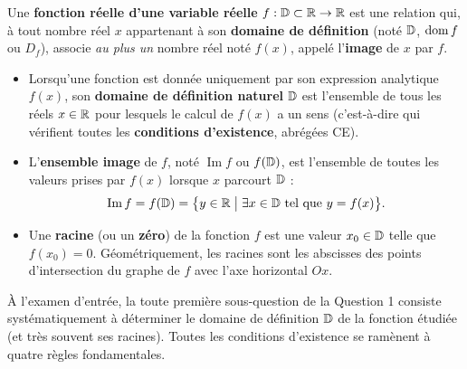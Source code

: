 \begin{definition}
Une \textbf{fonction réelle d'une variable réelle} $f : \mathbb{D} \subset \mathbb{R} \to \mathbb{R}$ est une relation qui, à tout nombre réel $x$ appartenant à son \textbf{domaine de définition} (noté $\mathbb{D}$, $\operatorname{dom} f$ ou $D_f$), associe \emph{au plus un} nombre réel noté $f(x)$, appelé l'\textbf{image} de $x$ par $f$.
\begin{itemize}
    \item Lorsqu'une fonction est donnée uniquement par son expression analytique $f(x)$, son \textbf{domaine de définition naturel} $\mathbb{D}$ est l'ensemble de tous les réels $x \in \mathbb{R}$ pour lesquels le calcul de $f(x)$ a un sens (c'est-à-dire qui vérifient toutes les \textbf{conditions d'existence}, abrégées CE).
    \item L'\textbf{ensemble image} de $f$, noté $\operatorname{Im} f$ ou $f(\mathbb{D})$, est l'ensemble de toutes les valeurs prises par $f(x)$ lorsque $x$ parcourt $\mathbb{D}$ :
    \[
        \operatorname{Im} f = f(\mathbb{D}) = \bigl\{ y \in \mathbb{R} \;\big|\; \exists x \in \mathbb{D} \text{ tel que } y = f(x) \bigr\}.
    \]
    \item Une \textbf{racine} (ou un \textbf{zéro}) de la fonction $f$ est une valeur $x_0 \in \mathbb{D}$ telle que $f(x_0) = 0$. Géométriquement, les racines sont les abscisses des points d'intersection du graphe de $f$ avec l'axe horizontal $Ox$.
\end{itemize}
\end{definition}

À l'examen d'entrée, la toute première sous-question de la Question 1 consiste systématiquement à déterminer le domaine de définition $\mathbb{D}$ de la fonction étudiée (et très souvent ses racines). Toutes les conditions d'existence se ramènent à quatre règles fondamentales.

